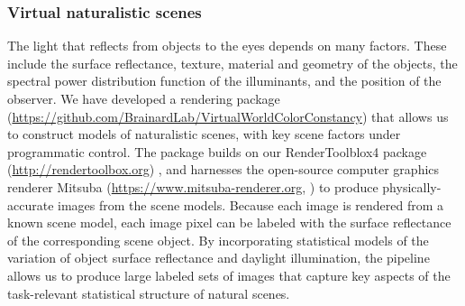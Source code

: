 \documentclass{jov}
\begin{document}
\subsubsection{Virtual naturalistic scenes}
The light that reflects from objects to the eyes depends on many factors.
These include the surface reflectance, texture, material and geometry of the objects, 
the spectral power distribution function of the illuminants, and the position of the observer.
We have developed a rendering package 
(\href{https://github.com/BrainardLab/VirtualWorldColorConstancy}{https://github.com/BrainardLab/VirtualWorldColorConstancy}) 
that allows us to construct models of naturalistic scenes, with key scene factors under programmatic control.
The package builds on our RenderToolblox4 package (\href{http://rendertoolbox.org}{http://rendertoolbox.org}) \cite{heasly2014rendertoolbox3},
and harnesses the open-source computer graphics renderer Mitsuba (\href{https://www.mitsuba-renderer.org}{https://www.mitsuba-renderer.org}, 
) to produce physically-accurate images from the scene models.
Because each image is rendered from a known scene model, each image pixel can be labeled with 
the surface reflectance of the corresponding scene object.
By incorporating statistical models of the variation of object surface reflectance and daylight illumination, 
the pipeline allows us to produce large labeled sets of images that capture key aspects of the task-relevant 
statistical structure of natural scenes.
\end{document}
